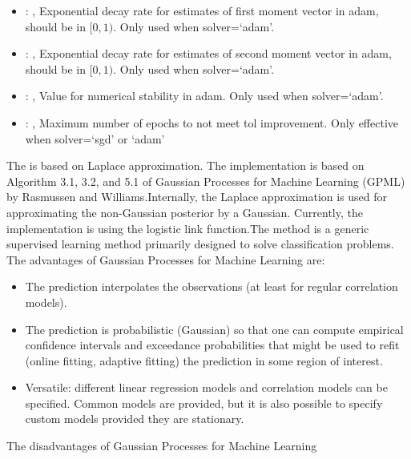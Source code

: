 \begin{itemize}
    \item {}: , 
      Exponential decay rate for estimates of first moment vector in adam, should be in $[0, 1)$.
      Only used when solver=`adam'.

    \item {}: , 
      Exponential decay rate for estimates of second moment vector in adam, should be in $[0, 1)$.
      Only used when solver=`adam'.

    \item {}: , 
      Value for numerical stability in adam. Only used when solver=`adam'.

    \item {}: , 
      Maximum number of epochs to not meet tol improvement. Only effective when
      solver=`sgd' or `adam'
  \end{itemize}
 The  is based on Laplace approximation. The implementation
 is based on Algorithm 3.1, 3.2, and 5.1 of Gaussian Processes for Machine Learning (GPML) by
 Rasmussen and Williams.Internally, the Laplace approximation is used for approximating the
 non-Gaussian posterior by a Gaussian. Currently, the implementation is using the
 logistic link function.The method is a generic supervised learning                          method
 primarily designed to solve classification problems.                          The advantages of
 Gaussian Processes for Machine Learning are:                          \begin{itemize}
 \item The prediction interpolates the observations (at least for regular
 correlation models).                            \item The prediction is probabilistic (Gaussian) so
 that one can compute                            empirical confidence intervals and exceedance
 probabilities that might be used                            to refit (online fitting, adaptive
 fitting) the prediction in some region of                            interest.
 \item Versatile: different linear regression models and correlation models can
 be specified.                            Common models are provided, but it is also possible to
 specify custom models                            provided they are stationary.
 \end{itemize}                          The disadvantages of Gaussian Processes for Machine Learning
